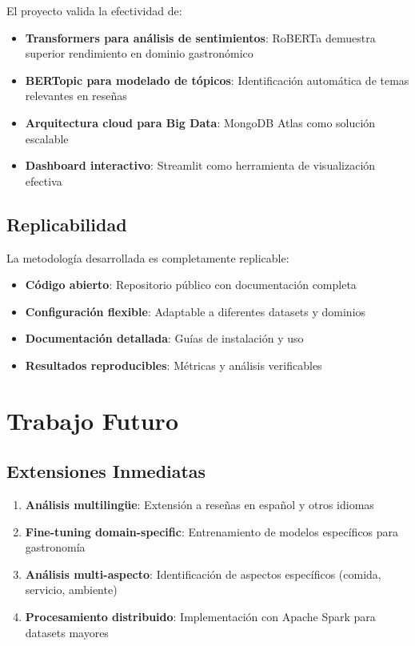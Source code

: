 \documentclass[12pt,a4paper,twoside,openany]{book}
\begin{document}
El proyecto valida la efectividad de:

\begin{itemize}
    \item \textbf{Transformers para análisis de sentimientos}: RoBERTa demuestra superior rendimiento en dominio gastronómico
    \item \textbf{BERTopic para modelado de tópicos}: Identificación automática de temas relevantes en reseñas
    \item \textbf{Arquitectura cloud para Big Data}: MongoDB Atlas como solución escalable
    \item \textbf{Dashboard interactivo}: Streamlit como herramienta de visualización efectiva
\end{itemize}

\subsection{Replicabilidad}

La metodología desarrollada es completamente replicable:

\begin{itemize}
    \item \textbf{Código abierto}: Repositorio público con documentación completa
    \item \textbf{Configuración flexible}: Adaptable a diferentes datasets y dominios
    \item \textbf{Documentación detallada}: Guías de instalación y uso
    \item \textbf{Resultados reproducibles}: Métricas y análisis verificables
\end{itemize}

\section{Trabajo Futuro}

\subsection{Extensiones Inmediatas}

\begin{enumerate}
    \item \textbf{Análisis multilingüe}: Extensión a reseñas en español y otros idiomas
    \item \textbf{Fine-tuning domain-specific}: Entrenamiento de modelos específicos para gastronomía
    \item \textbf{Análisis multi-aspecto}: Identificación de aspectos específicos (comida, servicio, ambiente)
    \item \textbf{Procesamiento distribuido}: Implementación con Apache Spark para datasets mayores
\end{enumerate}
\end{document}
